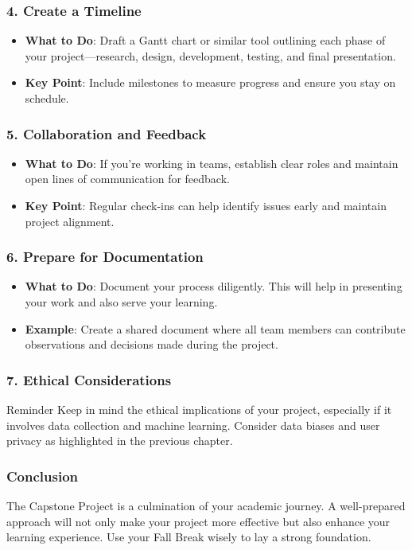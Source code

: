 \documentclass[aspectratio=169]{beamer}
\begin{document}
\begin{frame}
    \frametitle{4. Create a Timeline}
    \begin{itemize}
        \item \textbf{What to Do}: Draft a Gantt chart or similar tool outlining each phase of your project—research, design, development, testing, and final presentation.
        \item \textbf{Key Point}: Include milestones to measure progress and ensure you stay on schedule.
    \end{itemize}
\end{frame}

\begin{frame}
    \frametitle{5. Collaboration and Feedback}
    \begin{itemize}
        \item \textbf{What to Do}: If you're working in teams, establish clear roles and maintain open lines of communication for feedback.
        \item \textbf{Key Point}: Regular check-ins can help identify issues early and maintain project alignment.
    \end{itemize}
\end{frame}

\begin{frame}
    \frametitle{6. Prepare for Documentation}
    \begin{itemize}
        \item \textbf{What to Do}: Document your process diligently. This will help in presenting your work and also serve your learning.
        \item \textbf{Example}: Create a shared document where all team members can contribute observations and decisions made during the project.
    \end{itemize}
\end{frame}

\begin{frame}
    \frametitle{7. Ethical Considerations}
    \begin{block}{Reminder}
        Keep in mind the ethical implications of your project, especially if it involves data collection and machine learning. Consider data biases and user privacy as highlighted in the previous chapter.
    \end{block}
\end{frame}

\begin{frame}
    \frametitle{Conclusion}
    The Capstone Project is a culmination of your academic journey. A well-prepared approach will not only make your project more effective but also enhance your learning experience. Use your Fall Break wisely to lay a strong foundation.
\end{frame}
\end{document}
